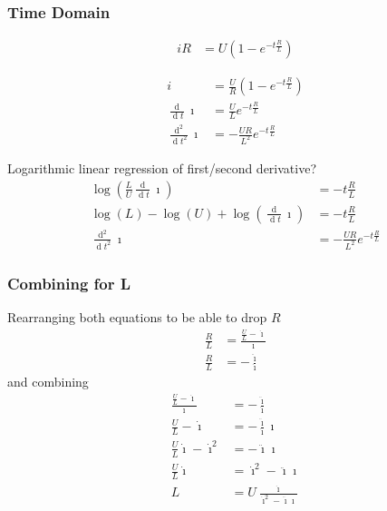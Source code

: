\documentclass[12pt,a4paper,oneside,openany]{article}
\DeclareMathOperator{\ud}{d}
\begin{document}
\subsubsection{Time Domain}

\begin{align}
i R&= U \left( 1 - e^{-t\frac{R}{L}} \right)
\end{align}


\begin{align}
i &= \frac{U}{R} \left( 1 - e^{-t\frac{R}{L}} \right) \\
\frac{\ud}{\ud t} \imath &= \frac{U}{L} e^{-t\frac{R}{L}} \\
\frac{\ud^2}{\ud t^2} \imath &= -\frac{UR}{L^2} e^{-t\frac{R}{L}}
\end{align}

Logarithmic linear regression of first/second derivative?
\begin{align}
\log \left(\frac{L}{U} \frac{\ud}{\ud t} \imath \right) &= -t\frac{R}{L} \\
\log \left( L \right) - \log \left(U \right) + \log \left(\frac{\ud}{\ud t} \imath \right) &= -t\frac{R}{L} \\
\frac{\ud^2}{\ud t^2} \imath &= -\frac{UR}{L^2} e^{-t\frac{R}{L}}
\end{align}



\subsubsection{Combining for L}

Rearranging both equations to be able to drop $R$
\begin{align}
\frac{R}{L} &= \frac{\frac{U}{L} - \dot{\imath}}{\imath} \\
\frac{R}{L} &= - \frac{ \ddot{\imath}}{ \dot{\imath}}
\end{align}
and combining
\begin{align}
\frac{\frac{U}{L} -  \dot{\imath}}{\imath} &= - \frac{\ddot{\imath}}{ \dot{\imath}} \\
\frac{U}{L} -  \dot{\imath} &= - \frac{\ddot{\imath}}{\dot{\imath}} \imath \\
\frac{U}{L}  \dot{\imath} - \dot{\imath}^2 &= - \ddot{\imath} \imath \\
\frac{U}{L}  \dot{\imath} &= \dot{\imath}^2 - \ddot{\imath} \imath \\
L &= U \frac{ \dot{\imath}}{ \dot{\imath}^2 - \ddot{\imath} \imath}
\end{align}
\end{document}
